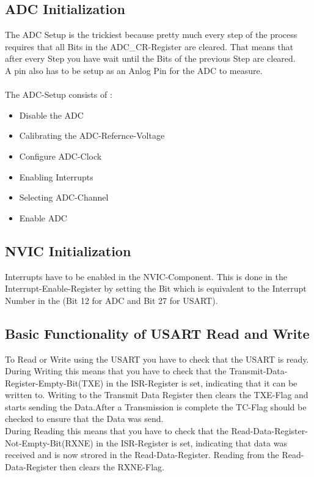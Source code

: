 

\pagebreak

\subsection{ADC Initialization}

The ADC Setup is the trickiest because pretty much every step of the process requires that all Bits in the ADC\_CR-Register are cleared.
That means that after every Step you have wait until the Bits of the previous Step are cleared.\\
A pin also has to be setup as an Anlog Pin for the ADC to measure.\\ \\
The ADC-Setup consists of :
\begin{itemize}
	\item Disable the ADC
	\item Calibrating the ADC-Refernce-Voltage
	\item Configure ADC-Clock
	\item Enabling Interrupts
	\item Selecting ADC-Channel
	\item Enable ADC
\end{itemize}



\pagebreak

\subsection{NVIC Initialization}

Interrupts have to be enabled in the NVIC-Component.
This is done in the Interrupt-Enable-Register by setting the Bit which is equivalent to the Interrupt Number in the  (Bit 12 for ADC and Bit 27 for USART).



\pagebreak

\subsection{Basic Functionality of USART Read and Write}

To Read or Write using the USART you have to check that the USART is ready.
During Writing this means that you have to check that the Transmit-Data-Register-Empty-Bit(TXE) in the ISR-Register is set, indicating that it can be written to. Writing to the Transmit Data Register then clears the TXE-Flag and starts sending the Data.After a Transmission is complete the TC-Flag should be checked to ensure that the Data was send.\\
During Reading this means that you have to check that the Read-Data-Register-Not-Empty-Bit(RXNE) in the ISR-Register is set, indicating that data was received and is now strored in the Read-Data-Register. Reading from the Read-Data-Register then clears the RXNE-Flag.

